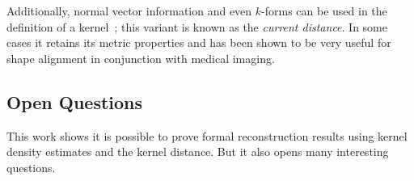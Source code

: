\documentclass[11pt]{myclass}
\begin{document}
Additionally, normal vector information and even $k$-forms can be used in the definition of a kernel~\cite{glaunesthesis,Vaillant2005,DurrlemanPennecTrouve2008,
DurrlemanPennecTrouve2007,GlaunesJoshi2006,JoshiKommarajuPhillips2011}; this variant is known as the \emph{current distance}.  In some cases it retains its metric properties and has been shown to be very useful for shape alignment in conjunction with medical imaging.  






\subsection{Open Questions}
\label{sec:open}
This work shows it is possible to prove formal reconstruction results using kernel density estimates and the kernel distance.  But it also opens many interesting questions.  
\end{document}
